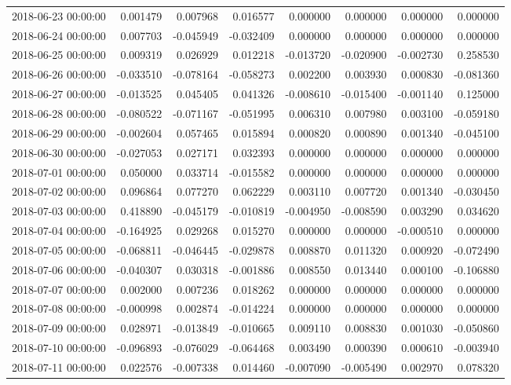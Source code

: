 \begin{tabular}{lrrrrrrr}
2018-06-23 00:00:00 & 0.001479 & 0.007968 & 0.016577 & 0.000000 & 0.000000 & 0.000000 & 0.000000 \\
2018-06-24 00:00:00 & 0.007703 & -0.045949 & -0.032409 & 0.000000 & 0.000000 & 0.000000 & 0.000000 \\
2018-06-25 00:00:00 & 0.009319 & 0.026929 & 0.012218 & -0.013720 & -0.020900 & -0.002730 & 0.258530 \\
2018-06-26 00:00:00 & -0.033510 & -0.078164 & -0.058273 & 0.002200 & 0.003930 & 0.000830 & -0.081360 \\
2018-06-27 00:00:00 & -0.013525 & 0.045405 & 0.041326 & -0.008610 & -0.015400 & -0.001140 & 0.125000 \\
2018-06-28 00:00:00 & -0.080522 & -0.071167 & -0.051995 & 0.006310 & 0.007980 & 0.003100 & -0.059180 \\
2018-06-29 00:00:00 & -0.002604 & 0.057465 & 0.015894 & 0.000820 & 0.000890 & 0.001340 & -0.045100 \\
2018-06-30 00:00:00 & -0.027053 & 0.027171 & 0.032393 & 0.000000 & 0.000000 & 0.000000 & 0.000000 \\
2018-07-01 00:00:00 & 0.050000 & 0.033714 & -0.015582 & 0.000000 & 0.000000 & 0.000000 & 0.000000 \\
2018-07-02 00:00:00 & 0.096864 & 0.077270 & 0.062229 & 0.003110 & 0.007720 & 0.001340 & -0.030450 \\
2018-07-03 00:00:00 & 0.418890 & -0.045179 & -0.010819 & -0.004950 & -0.008590 & 0.003290 & 0.034620 \\
2018-07-04 00:00:00 & -0.164925 & 0.029268 & 0.015270 & 0.000000 & 0.000000 & -0.000510 & 0.000000 \\
2018-07-05 00:00:00 & -0.068811 & -0.046445 & -0.029878 & 0.008870 & 0.011320 & 0.000920 & -0.072490 \\
2018-07-06 00:00:00 & -0.040307 & 0.030318 & -0.001886 & 0.008550 & 0.013440 & 0.000100 & -0.106880 \\
2018-07-07 00:00:00 & 0.002000 & 0.007236 & 0.018262 & 0.000000 & 0.000000 & 0.000000 & 0.000000 \\
2018-07-08 00:00:00 & -0.000998 & 0.002874 & -0.014224 & 0.000000 & 0.000000 & 0.000000 & 0.000000 \\
2018-07-09 00:00:00 & 0.028971 & -0.013849 & -0.010665 & 0.009110 & 0.008830 & 0.001030 & -0.050860 \\
2018-07-10 00:00:00 & -0.096893 & -0.076029 & -0.064468 & 0.003490 & 0.000390 & 0.000610 & -0.003940 \\
2018-07-11 00:00:00 & 0.022576 & -0.007338 & 0.014460 & -0.007090 & -0.005490 & 0.002970 & 0.078320 \\

\end{tabular}
